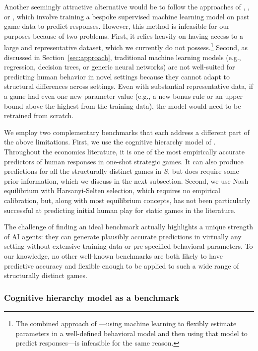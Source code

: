 \documentclass[11pt]{article}
\theoremstyle{definition}
\newcommand{\aisub}{AI agent}
\begin{document}
Another seemingly attractive alternative would be to follow the approaches of \cite{FudenbergLiang2019PredictPlay}, \cite{hirasawa2022using}, or \cite{andrews2025transfer}, which involve training a bespoke supervised machine learning model on past game data to predict responses. 
However, this method is infeasible for our purposes because of two problems. 
First, it relies heavily on having access to a large and representative dataset, which we currently do not possess.\footnote{The combined approach of \cite{zhu2025capturing}---using machine learning to flexibly estimate parameters in a well-defined behavioral model and then using that model to predict responses---is infeasible for the same reason.} 
Second, as discussed in Section~\ref{sec:approach}, traditional machine learning models (e.g., regression, decision trees, or generic neural networks) are not well-suited for predicting human behavior in novel settings because they cannot adapt to structural differences across settings.
Even with substantial representative data, if a game had even one new parameter value (e.g., a new bonus rule or an upper bound above the highest from the training data), the model would need to be retrained from scratch.

We employ two complementary benchmarks that each address a different part of the above limitations.
First, we use the cognitive hierarchy model of \cite{Camerer2004Cognitive}.
Throughout the economics literature, it is one of the most empirically accurate predictors of human responses in one-shot strategic games.
It can also produce predictions for all the structurally distinct games in $S$, but does require some prior information, which we discuss in the next subsection.
Second, we use Nash equilibrium with Harsanyi-Selten selection, which requires no empirical calibration, but, along with most equilibrium concepts, has not been particularly successful at predicting initial human play for static games in the literature. 

The challenge of finding an ideal benchmark actually highlights a unique strength of \aisub{s}: they can generate plausibly accurate predictions in virtually any setting without extensive training data or pre-specified behavioral parameters.
To our knowledge, no other well-known benchmarks are both likely to have predictive accuracy and flexible enough to be applied to such a wide range of structurally distinct games.

\subsubsection{Cognitive hierarchy model as a benchmark}
\end{document}
